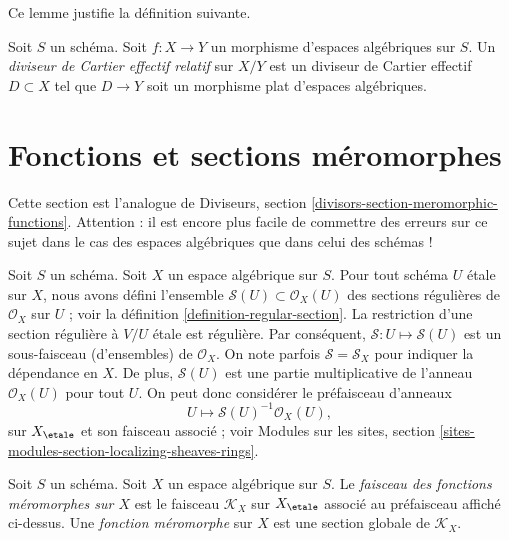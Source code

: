 \noindent
Ce lemme justifie la définition suivante.

\begin{definition}
\label{definition-relative-effective-Cartier-divisor}
Soit $S$ un schéma.
Soit $f : X \to Y$ un morphisme d'espaces algébriques sur $S$.
Un {\it diviseur de Cartier effectif relatif} sur $X/Y$ est un
diviseur de Cartier effectif $D \subset X$ tel que $D \to Y$
soit un morphisme plat d'espaces algébriques.
\end{definition}








\section{Fonctions et sections méromorphes}
\label{section-meromorphic-functions}

\noindent
Cette section est l'analogue de
Diviseurs, section \ref{divisors-section-meromorphic-functions}.
Attention : il est encore plus facile de commettre des erreurs sur ce sujet dans le
cas des espaces algébriques que dans celui des schémas !

\medskip\noindent
Soit $S$ un schéma. Soit $X$ un espace algébrique sur $S$.
Pour tout schéma $U$ \'etale sur $X$, nous avons défini l'ensemble
$\mathcal{S}(U) \subset \mathcal{O}_X(U)$
des sections régulières de $\mathcal{O}_X$ sur $U$ ; voir la
définition \ref{definition-regular-section}. La restriction
d'une section régulière à $V/U$ \'etale est régulière. Par conséquent,
$\mathcal{S} : U \mapsto \mathcal{S}(U)$ est un sous-faisceau (d'ensembles)
de $\mathcal{O}_X$. On note parfois $\mathcal{S} = \mathcal{S}_X$
pour indiquer la dépendance en $X$.
De plus, $\mathcal{S}(U)$
est une partie multiplicative de l'anneau $\mathcal{O}_X(U)$ pour
tout $U$. On peut donc considérer
le préfaisceau d'anneaux
$$
U \longmapsto \mathcal{S}(U)^{-1} \mathcal{O}_X(U),
$$
sur $X_\etale$ et son faisceau associé ; voir
Modules sur les sites, section \ref{sites-modules-section-localizing-sheaves-rings}.

\begin{definition}
\label{definition-sheaf-meromorphic-functions}
Soit $S$ un schéma. Soit $X$ un espace algébrique sur $S$.
Le {\it faisceau des fonctions méromorphes sur $X$} est
le faisceau {\it $\mathcal{K}_X$} sur $X_\etale$ associé au préfaisceau
affiché ci-dessus. Une {\it fonction méromorphe} sur $X$
est une section globale de $\mathcal{K}_X$.
\end{definition}

